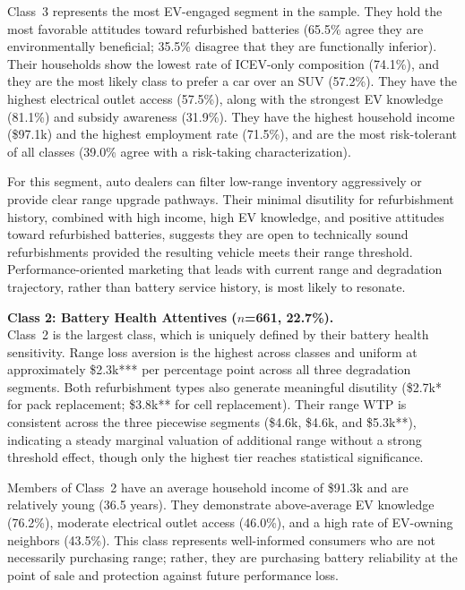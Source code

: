 \documentclass[a4paper,fleqn]{cas-sc}   %
\begin{document}
Class~3 represents the most EV-engaged segment in the sample. They hold the most favorable attitudes toward refurbished batteries (65.5\% agree they are environmentally beneficial; 35.5\% disagree that they are functionally inferior). Their households show the lowest rate of ICEV-only composition (74.1\%), and they are the most likely class to prefer a car over an SUV (57.2\%). They have the highest electrical outlet access (57.5\%), along with the strongest EV knowledge (81.1\%) and subsidy awareness (31.9\%). They have the highest household income (\$97.1k) and the highest employment rate (71.5\%), and are the most risk-tolerant of all classes (39.0\% agree with a risk-taking characterization).

For this segment, auto dealers can filter low-range inventory aggressively or provide clear range upgrade pathways. Their minimal disutility for refurbishment history, combined with high income, high EV knowledge, and positive attitudes toward refurbished batteries, suggests they are open to technically sound refurbishments provided the resulting vehicle meets their range threshold. Performance-oriented marketing that leads with current range and degradation trajectory, rather than battery service history, is most likely to resonate.

\medskip

\noindent\textbf{Class 2: Battery Health Attentives ($n$=661, 22.7\%).}\\
Class~2 is the largest class, which is uniquely defined by their battery health sensitivity.  Range loss aversion is the highest across classes and uniform at approximately \$2.3k*** per percentage point across all three degradation segments. Both refurbishment types also generate meaningful disutility (\$2.7k* for pack replacement; \$3.8k** for cell replacement). Their range WTP is consistent across the three piecewise segments (\$4.6k, \$4.6k, and \$5.3k**), indicating a steady marginal valuation of additional range without a strong threshold effect, though only the highest tier reaches statistical significance.

Members of Class~2 have an average household income of \$91.3k and are relatively young (36.5 years). They demonstrate above-average EV knowledge (76.2\%), moderate electrical outlet access (46.0\%), and a high rate of EV-owning neighbors (43.5\%). This class represents well-informed consumers who are not necessarily purchasing range; rather, they are purchasing battery reliability at the point of sale and protection against future performance loss. 
\end{document}
